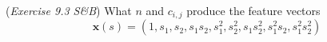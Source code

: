 (\textit{Exercise 9.3 S\&B})
What $n$ and $c_{{i,j}}$ produce the feature vectors
$$\mathbf{x}(s) = (1, s_{1}, s_{2}, s_{1}s_{2}, s_{1}^{2}, s_{2}^{2},s_{1}s_{2}^{2}, s_{1}^{2}s_{2},s_{1}^{2}s_{2}^{2})$$
